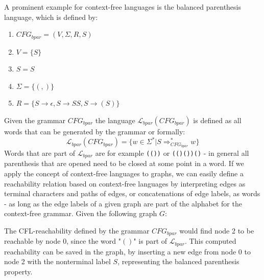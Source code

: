 A prominent example for context-free languages is the balanced parenthesis language, which is defined by:
\begin{enumerate}
    \item $CFG_{bpar}=(V,\Sigma,R,S)$
    \item $V=\{S\}$
    \item $S=S$
    \item $\Sigma=\{(,)\}$
    \item $R=\{S\rightarrow\epsilon, S\rightarrow SS, S\rightarrow (S)\}$
\end{enumerate}
Given the grammar $CFG_{bpar}$ the language $\mathcal{L}_{bpar}(CFG_{bpar})$ is defined as all words that can be generated by the grammar or formally: $$\mathcal{L}_{bpar}(CFG_{bpar})= \{w\in \Sigma^* | S\Rightarrow_{CFG_{bpar}}^* w \}$$
Words that are part of $\mathcal{L}_{bpar}$ are for example \verb|(())| or \verb|(()())()| - in general all parenthesis that are opened need to be closed at some point in a word.
If we apply the concept of context-free languages to graphs, we can easily define a reachability relation based on context-free languages by interpreting edges as terminal characters and paths of edges, or concatenations of edge labels, as words - as long as the edge labels of a given graph are part of the alphabet for the context-free grammar.
Given the following graph $G$:
\begin{center}
\end{center}
The CFL-reachability defined by the grammar $CFG_{bpar}$ would find node 2 to be reachable by node 0, since the word "$()$" is part of $\mathcal{L}_{bpar}$.
This computed reachability can be saved in the graph, by inserting a new edge from node 0 to node 2 with the nonterminal label $S$, representing the balanced parenthesis property.
